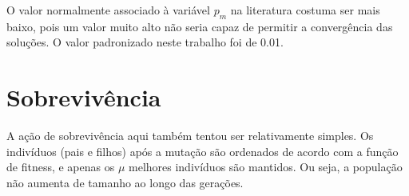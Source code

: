O valor normalmente associado à variável $p_m$ na literatura costuma ser mais baixo, pois um valor muito alto não seria capaz de permitir a convergência das soluções. O valor padronizado neste trabalho foi de 0.01.

\section{Sobrevivência}

A ação de sobrevivência aqui também tentou ser relativamente simples. Os indivíduos (pais e filhos) após a mutação são ordenados de acordo com a função de fitness, e apenas os $\mu$ melhores indivíduos são mantidos. Ou seja, a população não aumenta de tamanho ao longo das gerações.

